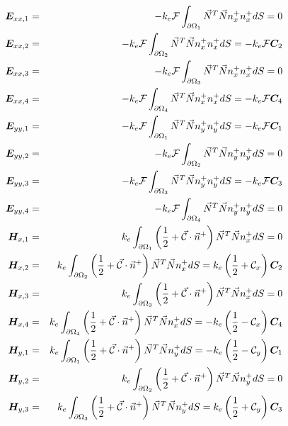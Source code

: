 \begin{eqnarray}
{\bm E}_{xx,1} &=& -k_e {\cal F} \int_{\partial\Omega_1}  \vec{N}^T\vec{N}  {n}^+_x   n^+_x dS = 0 \nn\\ 
{\bm E}_{xx,2} &=& -k_e {\cal F} \int_{\partial\Omega_2}  \vec{N}^T\vec{N}  {n}^+_x   n^+_x dS = -k_e {\cal F} {\bm C}_2  \nn\\ 
{\bm E}_{xx,3} &=& -k_e {\cal F} \int_{\partial\Omega_3}  \vec{N}^T\vec{N}  {n}^+_x   n^+_x dS = 0 \nn\\ 
{\bm E}_{xx,4} &=& -k_e {\cal F} \int_{\partial\Omega_4}  \vec{N}^T\vec{N}  {n}^+_x   n^+_x dS = -k_e {\cal F} {\bm C}_4  
\nn\\
{\bm E}_{yy,1} &=& -k_e {\cal F} \int_{\partial\Omega_1}  \vec{N}^T\vec{N}  {n}^+_y   n^+_y dS = -k_e {\cal F} {\bm C}_1  \nn\\ 
{\bm E}_{yy,2} &=& -k_e {\cal F} \int_{\partial\Omega_2}  \vec{N}^T\vec{N}  {n}^+_y   n^+_y dS = 0 \nn\\ 
{\bm E}_{yy,3} &=& -k_e {\cal F} \int_{\partial\Omega_3}  \vec{N}^T\vec{N}  {n}^+_y   n^+_y dS = -k_e {\cal F} {\bm C}_3  \nn\\  
{\bm E}_{yy,4} &=& -k_e {\cal F} \int_{\partial\Omega_4}  \vec{N}^T\vec{N}  {n}^+_y   n^+_y dS = 0 
\nn\\ 
{\bm H}_{x,1} &=& k_e \int_{\partial\Omega_1}  \left( \frac{1}{2} + \vec{\cal C} \cdot \vec{n}^+ \right) \vec{N}^T \vec{N} n^+_x dS = 0 \nn\\ 
{\bm H}_{x,2} &=& k_e \int_{\partial\Omega_2}  \left( \frac{1}{2} + \vec{\cal C} \cdot \vec{n}^+ \right) \vec{N}^T \vec{N} n^+_x dS = k_e  \left( \frac{1}{2} + {\cal C}_x \right) {\bm C}_{2} \nn\\ 
{\bm H}_{x,3} &=& k_e \int_{\partial\Omega_3}  \left( \frac{1}{2} + \vec{\cal C} \cdot \vec{n}^+ \right) \vec{N}^T \vec{N} n^+_x dS = 0 \nn\\ 
{\bm H}_{x,4} &=& k_e \int_{\partial\Omega_4}  \left( \frac{1}{2} + \vec{\cal C} \cdot \vec{n}^+ \right) \vec{N}^T \vec{N} n^+_x dS = - k_e  \left( \frac{1}{2} - {\cal C}_x \right) {\bm C}_{4} 
\nn\\
{\bm H}_{y,1} &=& k_e \int_{\partial\Omega_1}  \left( \frac{1}{2} + \vec{\cal C} \cdot \vec{n}^+ \right) \vec{N}^T \vec{N} n^+_y dS = -k_e  \left( \frac{1}{2} - {\cal C}_y \right) {\bm C}_{1} \nn\\ 
{\bm H}_{y,2} &=& k_e \int_{\partial\Omega_2}  \left( \frac{1}{2} + \vec{\cal C} \cdot \vec{n}^+ \right) \vec{N}^T \vec{N} n^+_y dS = 0 \nn\\ 
{\bm H}_{y,3} &=& k_e \int_{\partial\Omega_3}  \left( \frac{1}{2} + \vec{\cal C} \cdot \vec{n}^+ \right) \vec{N}^T \vec{N} n^+_y dS = k_e  \left( \frac{1}{2} + {\cal C}_y \right) {\bm C}_{3} \nn\\ 

\end{eqnarray}
